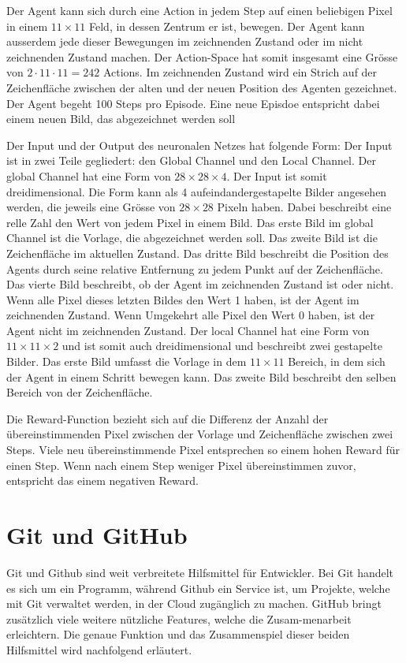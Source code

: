 Der Agent kann sich durch eine Action in jedem Step auf einen beliebigen Pixel
in einem $11\times11$ Feld, in dessen Zentrum er ist, bewegen. Der Agent kann
ausserdem jede dieser Bewegungen im zeichnenden Zustand oder im nicht
zeichnenden Zustand machen. Der Action-Space hat somit insgesamt eine Grösse von
$2\cdot11\cdot11 = 242$ Actions. Im zeichnenden Zustand wird ein Strich auf der
Zeichenfläche zwischen der alten und der neuen Position des Agenten gezeichnet.
Der Agent begeht 100 Steps pro Episode. Eine neue Episdoe entspricht dabei einem
neuen Bild, das abgezeichnet werden soll

Der Input und der Output des neuronalen Netzes hat folgende Form: Der Input ist
in zwei Teile gegliedert: den Global Channel und den Local Channel. 
Der global Channel hat eine Form von $28\times28\times4$. Der Input ist somit
dreidimensional. Die Form kann als 4 aufeindandergestapelte Bilder angesehen
werden, die jeweils eine Grösse von $28\times28$ Pixeln haben. Dabei beschreibt
eine relle Zahl den Wert von jedem Pixel in einem Bild. Das erste Bild im global
Channel ist die Vorlage, die abgezeichnet werden soll. Das zweite Bild ist die
Zeichenfläche im aktuellen Zustand. Das dritte Bild beschreibt die Position des
Agents durch seine relative Entfernung zu jedem Punkt auf der Zeichenfläche. Das
vierte Bild beschreibt, ob der Agent im zeichnenden Zustand ist oder nicht. Wenn
alle Pixel dieses letzten Bildes den Wert 1 haben, ist der Agent im zeichnenden
Zustand. Wenn Umgekehrt alle Pixel den Wert 0 haben, ist der Agent nicht im
zeichnenden Zustand. 
Der local Channel hat eine Form von $11\times11\times2$ und ist somit auch
dreidimensional und beschreibt zwei gestapelte Bilder. Das erste Bild umfasst
die Vorlage in dem $11\times11$ Bereich, in dem sich der Agent in einem Schritt
bewegen kann. Das zweite Bild beschreibt den selben Bereich von der Zeichenfläche.

Die Reward-Function bezieht sich auf die Differenz der Anzahl der
übereinstimmenden Pixel zwischen der Vorlage und Zeichenfläche zwischen zwei
Steps. Viele neu übereinstimmende Pixel entsprechen so einem hohen Reward für
einen Step. Wenn nach einem Step weniger Pixel übereinstimmen zuvor, entspricht
das einem negativen Reward. 

\section{Git und GitHub}
\label{chap:git_github}
Git und Github sind weit verbreitete Hilfsmittel für Entwickler. Bei Git handelt
es sich um ein Programm, während Github ein Service ist, um Projekte, welche mit
Git verwaltet werden, in der Cloud zugänglich zu machen. GitHub bringt zusätzlich
viele weitere nützliche Features, welche die Zusam\hyp{}menarbeit erleichtern. Die
genaue Funktion und das Zusammenspiel dieser beiden Hilfsmittel wird nachfolgend
erläutert.

